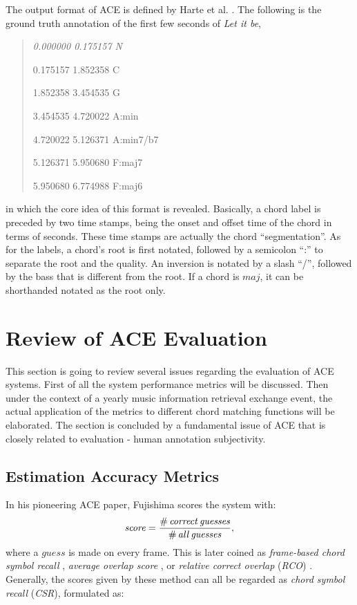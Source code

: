 The output format of ACE is defined by Harte et al. \cite{harte2005symbolic}. The following is the ground truth annotation of the first few seconds of {\it Let it be},
\begin{quote}\footnotesize \it
0.000000 0.175157 N

0.175157 1.852358 C

1.852358 3.454535 G

3.454535 4.720022 A:min

4.720022 5.126371 A:min7/b7

5.126371 5.950680 F:maj7

5.950680 6.774988 F:maj6
\end{quote}
in which the core idea of this format is revealed. Basically, a chord label is preceded by two time stamps, being the onset and offset time of the chord in terms of seconds. These time stamps are actually the chord ``segmentation''. As for the labels, a chord's root is first notated, followed by a semicolon ``:'' to separate the root and the quality. An inversion is notated by a slash ``/'', followed by the bass that is different from the root. If a chord is $maj$, it can be shorthanded notated as the root only.

\newpage
\section{Review of ACE Evaluation} \label{sec:2-eval}
This section is going to review several issues regarding the evaluation of ACE systems. First of all the system performance metrics will be discussed. Then under the context of a yearly music information retrieval exchange event, the actual application of the metrics to different chord matching functions will be elaborated. The section is concluded by a fundamental issue of ACE that is closely related to evaluation - human annotation subjectivity.

\subsection{Estimation Accuracy Metrics} \label{subsec:2-metrics}
In his pioneering ACE paper, Fujishima \cite{fujishima1999realtime} scores the system with:
\begin{equation}\label{eq:2-fujiscore}
\mathit{score = {\#\,correct\,guesses\over\#\,all\,guesses},}
\end{equation}
where a $guess$ is made on every frame. This is later coined as {\it frame-based chord symbol recall} \cite{harte2010towards}, {\it average overlap score} \cite{oudre2010template}, or {\it relative correct overlap} (\textit{RCO}) \cite{mauch2010automatic}. Generally, the scores given by these method can all be regarded as {\it chord symbol recall} (\textit{CSR}), formulated as:

